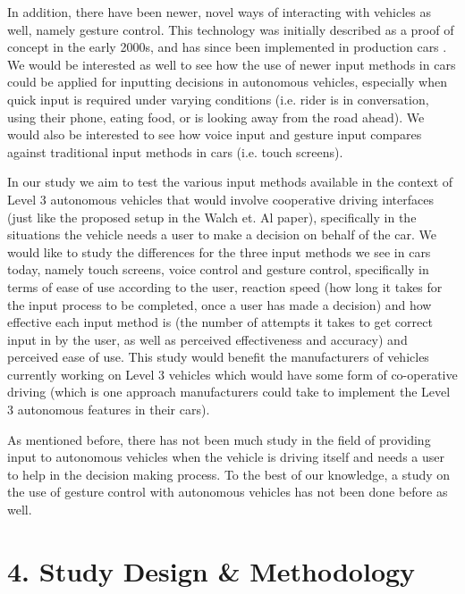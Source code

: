 \documentclass{sigchi}
\begin{document}
In addition, there have been newer, novel ways of interacting with vehicles as well, namely gesture control. This technology was initially described as a proof of concept in the early 2000s, and has since been implemented in production cars \cite{akyol2000gesture} \cite{continental}. We would be interested as well to see how the use of newer input methods in cars could be applied for inputting decisions in autonomous vehicles, especially when quick input is required under varying conditions (i.e. rider is in conversation, using their phone, eating food, or is looking away from the road ahead). We would also be interested to see how voice input and gesture input compares against traditional input methods in cars (i.e. touch screens). 

In our study we aim to test the various input methods available in the context of Level 3 autonomous vehicles that would involve cooperative driving interfaces (just like the proposed setup in the Walch et. Al paper), specifically in the situations the vehicle needs a user to make a decision on behalf of the car. We would like to study the differences for the three input methods we see in cars today, namely touch screens, voice control and gesture control, specifically in terms of ease of use according to the user, reaction speed (how long it takes for the input process to be completed, once a user has made a decision) and how effective each input method is (the number of attempts it takes to get correct input in by the user, as well as perceived effectiveness and accuracy) and perceived ease of use. This study would benefit the manufacturers of vehicles currently working on Level 3 vehicles which would have some form of co-operative driving (which is one approach manufacturers could take to implement the Level 3 autonomous features in their cars).

As mentioned before, there has not been much study in the field of providing input to autonomous vehicles when the vehicle is driving itself and needs a user to help in the decision making process. To the best of our knowledge, a study on the use of gesture control with autonomous vehicles has not been done before as well.

\section{4. Study Design \& Methodology}
\end{document}
